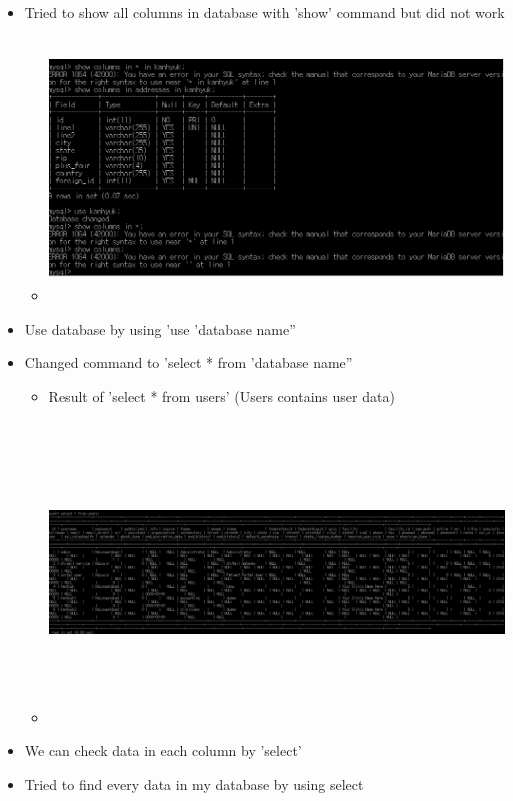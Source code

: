 \documentclass[paper=a4, fontsize=11pt]{scrartcl} %
\numberwithin{equation}{section} %
\numberwithin{figure}{section} %
\numberwithin{table}{section} %
\begin{document}
\begin{itemize}
	\item Tried to show all columns in database with 'show' command but did not work
		\begin{itemize}
		\item
		 \includegraphics[width = 20cm, height=7cm]{pictures/selectcoler.jpg}
		\end{itemize}
	\item Use database by using 'use 'database name''
	\item Changed command to 'select * from 'database name''
		\begin{itemize}	
			\item Result of 'select * from users' (Users contains  user data)
			\item
			 \includegraphics[width = 35cm, height=8cm]{pictures/userdata.png}
		\end{itemize}
	\item We can check data in each column by 'select'
	\item Tried to find every data in my database by using select

\end{itemize}
\end{document}
